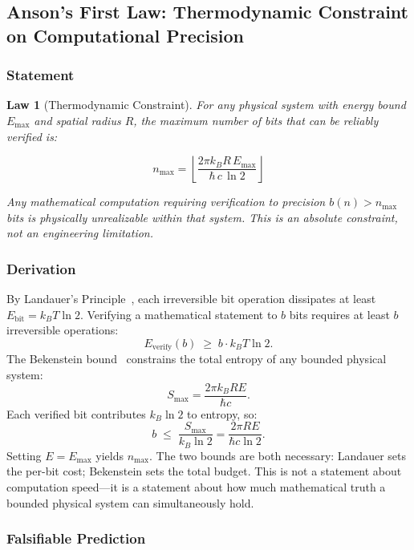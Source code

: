 \documentclass[12pt]{article}
\theoremstyle{lawstyle}
\newtheorem{law}{Law}
\theoremstyle{conjstyle}
\theoremstyle{predstyle}
\begin{document}
\subsection{Anson's First Law: Thermodynamic Constraint on Computational Precision}

\subsubsection*{Statement}

\begin{law}[Thermodynamic Constraint]
For any physical system with energy bound $E_{\max}$ and spatial radius $R$, the maximum
number of bits that can be reliably verified is:
\begin{lawbox}
\[
  n_{\max} = \left\lfloor \frac{2\pi k_B R\, E_{\max}}{\hbar\, c\, \ln 2} \right\rfloor
\]
\end{lawbox}
Any mathematical computation requiring verification to precision $b(n) > n_{\max}$ bits is
physically unrealizable within that system. This is an absolute constraint, not an
engineering limitation.
\end{law}

\subsubsection*{Derivation}

By Landauer's Principle~\cite{landauer1961}, each irreversible bit operation dissipates at
least $E_{\mathrm{bit}} = k_B T \ln 2$. Verifying a mathematical statement to $b$ bits
requires at least $b$ irreversible operations:
\[
  E_{\mathrm{verify}}(b) \;\geq\; b \cdot k_B T \ln 2.
\]
The Bekenstein bound~\cite{bekenstein1981} constrains the total entropy of any bounded
physical system:
\[
  S_{\max} = \frac{2\pi k_B R E}{\hbar c}.
\]
Each verified bit contributes $k_B \ln 2$ to entropy, so:
\[
  b \;\leq\; \frac{S_{\max}}{k_B \ln 2} = \frac{2\pi R E}{\hbar c \ln 2}.
\]
Setting $E = E_{\max}$ yields $n_{\max}$. The two bounds are both necessary: Landauer sets
the per-bit cost; Bekenstein sets the total budget. This is not a statement about computation
speed---it is a statement about how much mathematical truth a bounded physical system can
simultaneously hold.

\subsubsection*{Falsifiable Prediction}
\end{document}
